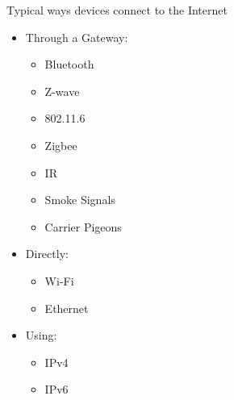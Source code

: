\begin{frame}
	{Typical ways devices connect to the Internet}

	\begin{multicols}{2}
		\begin{itemize}
			\item Through a Gateway:
			\begin{itemize}
				\item Bluetooth
				\item Z-wave
				\item 802.11.6
				\item Zigbee
				\item IR
				\item Smoke Signals
				\item Carrier Pigeons
			\end{itemize}
		\end{itemize}

		\vfill\null
		\columnbreak

		\begin{itemize}
			\item Directly:
			\begin{itemize}
				\item Wi-Fi
				\item Ethernet
			\end{itemize}
		\end{itemize}

		\begin{itemize}
			\item Using:
			\begin{itemize}
				\item IPv4
				\item IPv6
			\end{itemize}
		\end{itemize}
	\end{multicols}

\end{frame}

\cprotect\note{
}

